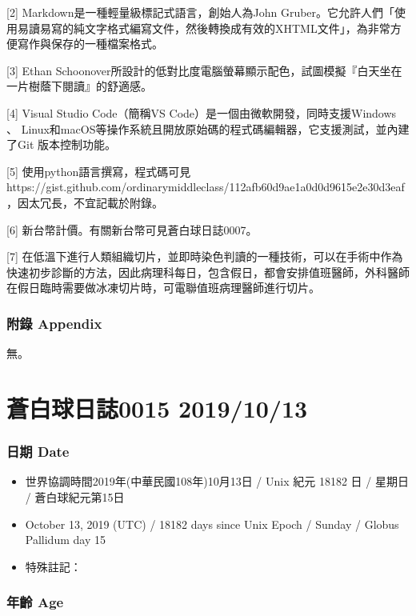 \documentclass[
]{article}
\providecommand{\tightlist}{%
  \setlength{\itemsep}{0pt}\setlength{\parskip}{0pt}}
\begin{document}
{[}2{]} Markdown是一種輕量級標記式語言，創始人為John
Gruber。它允許人們「使用易讀易寫的純文字格式編寫文件，然後轉換成有效的XHTML文件」，為非常方便寫作與保存的一種檔案格式。

{[}3{]} Ethan
Schoonover所設計的低對比度電腦螢幕顯示配色，試圖模擬『白天坐在一片樹蔭下閱讀』的舒適感。

{[}4{]} Visual Studio Code（簡稱VS
Code）是一個由微軟開發，同時支援Windows 、
Linux和macOS等操作系統且開放原始碼的程式碼編輯器，它支援測試，並內建了Git
版本控制功能。

{[}5{]} 使用python語言撰寫，程式碼可見
https://gist.github.com/ordinarymiddleclass/112afb60d9ae1a0d0d9615e2e30d3eaf
，因太冗長，不宜記載於附錄。

{[}6{]} 新台幣計價。有關新台幣可見蒼白球日誌0007。

{[}7{]}
在低溫下進行人類組織切片，並即時染色判讀的一種技術，可以在手術中作為快速初步診斷的方法，因此病理科每日，包含假日，都會安排值班醫師，外科醫師在假日臨時需要做冰凍切片時，可電聯值班病理醫師進行切片。

\hypertarget{ux9644ux9304-appendix-6}{%
\subsubsection{附錄 Appendix}\label{ux9644ux9304-appendix-6}}

無。

\hypertarget{ux84bcux767dux7403ux65e5ux8a8c0015-20191013}{%
\section{蒼白球日誌0015
2019/10/13}\label{ux84bcux767dux7403ux65e5ux8a8c0015-20191013}}

\hypertarget{ux65e5ux671f-date-12}{%
\subsubsection{日期 Date}\label{ux65e5ux671f-date-12}}

\begin{itemize}
\tightlist
\item
  世界協調時間2019年(中華民國108年)10月13日 / Unix 紀元 18182 日 /
  星期日 / 蒼白球紀元第15日
\item
  October 13, 2019 (UTC) / 18182 days since Unix Epoch / Sunday / Globus
  Pallidum day 15
\item
  特殊註記：
\end{itemize}

\hypertarget{ux5e74ux9f61-age-12}{%
\subsubsection{年齡 Age}\label{ux5e74ux9f61-age-12}}
\end{document}
